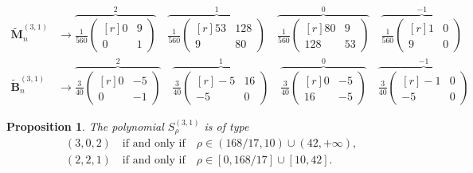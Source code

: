 \documentclass[10pt,a4paper]{amsart}
\newtheorem{proposition}{Proposition}
\newcommand{\SR}{S}
\newcommand{\nf}{\infty}
\begin{document}
\begin{align}\label{eq:422}
\widetilde{\mathbf{M}}_{n}^{(3,1)} &\to
\overbrace{\frac{1}{560}\begin{pmatrix}[r]
0 & 9
\\ 0 & 1
\end{pmatrix}}^{2}
\quad
\overbrace{\frac{1}{560}\begin{pmatrix}[r]
53 & 128
\\ 9 & 80
\end{pmatrix}}^{1}
\quad
\overbrace{\frac{1}{560}\begin{pmatrix}[r]
80 & 9
\\ 128 & 53
\end{pmatrix}}^{0}
\quad
\overbrace{\frac{1}{560}\begin{pmatrix}[r]
1 & 0
\\ 9 & 0
\end{pmatrix}}^{-1}
\\
\widetilde{\mathbf{B}}_{n}^{(3,1)} &\to
\overbrace{\frac{3}{40}\begin{pmatrix}[r]
0 &-5
\\ 0 &-1
\end{pmatrix}}^{2}
\quad
\overbrace{\frac{3}{40}\begin{pmatrix}[r]
-5 & 16
\\-5 & 0
\end{pmatrix}}^{1}
\quad
\overbrace{\frac{3}{40}\begin{pmatrix}[r]
0 &-5
\\ 16 &-5
\end{pmatrix}}^{0}
\quad
\overbrace{\frac{3}{40}\begin{pmatrix}[r]
-1 & 0
\\-5 & 0
\end{pmatrix}}^{-1}
\label{eq:423}
\end{align}

\begin{proposition}\label{prop:43}
The polynomial $\SR_{\rho}^{(3,1)}$ is of type
\begin{align*}
&(3,0,2)\quad\text{if and only if}\quad\rho\in (168/17,10)\cup (42,+\nf),\\
&(2,2,1)\quad\text{if and only if}\quad\rho\in [0,168/17]\cup [10,42].
\end{align*}
\end{proposition}
\end{document}
